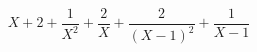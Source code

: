 \begin{displaymath}
 X+2 + \frac{1}{X^2} + \frac{2}{X} + \frac{2}{(X-1)^2} + \frac{1}{X-1}
\end{displaymath}
